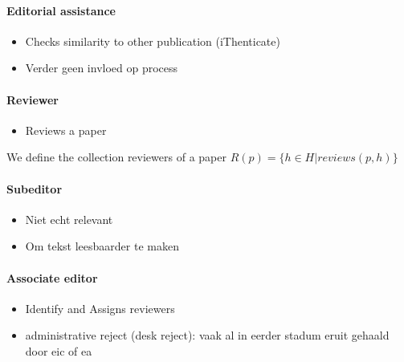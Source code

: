 {%
\paragraph{Editorial assistance}
\begin{itemize}
    \item Checks similarity to other publication (iThenticate)
    \item Verder geen invloed op process
\end{itemize}

\paragraph{Reviewer}
\begin{itemize}
    \item Reviews a paper
\end{itemize}
We define the collection reviewers of a paper $R(p) = \{h \in H | reviews(p, h)\}$
\paragraph{Subeditor}
\begin{itemize}
    \item Niet echt relevant
    \item Om tekst leesbaarder te maken
\end{itemize}
\paragraph{Associate editor}
\begin{itemize}
    \item Identify and Assigns reviewers
    \item administrative reject (desk reject): vaak al in eerder stadum eruit gehaald door eic of ea


\end{itemize}}
